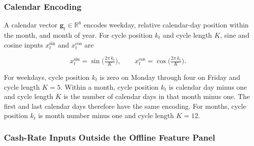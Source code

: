 \subsubsection{Calendar Encoding}

A calendar vector \(\mathbf g_t\in\mathbb R^6\) encodes weekday, relative calendar-day position within the month, and month of year. For cycle position \(k_t\) and cycle length \(K\), sine and cosine inputs \(x_t^{\sin}\) and \(x_t^{\cos}\) are

\begin{equation}
x^{\sin}_t = \sin\!\Big(\tfrac{2\pi\, k_t}{K}\Big), \qquad x^{\cos}_t = \cos\!\Big(\tfrac{2\pi\, k_t}{K}\Big).
\label{eq:feature-calendar}
\end{equation}

For weekdays, cycle position \(k_t\) is zero on Monday through four on Friday and cycle length \(K=5\). Within a month, cycle position \(k_t\) is calendar day minus one and cycle length \(K\) is the number of calendar days in that month minus one. The first and last calendar days therefore have the same encoding. For months, cycle position \(k_t\) is month number minus one and cycle length \(K=12\).

\subsubsection{Cash-Rate Inputs Outside the Offline Feature Panel}
\label{sec:cash-inputs}

